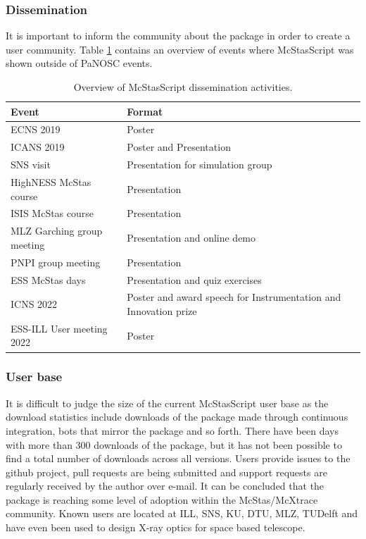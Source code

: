\documentclass[11pt, a4paper]{article}
\begin{document}
\subsubsection{Dissemination}
It is important to inform the community about the package in order to create a user community. Table \ref{tab:Dissemination} contains an overview of events where McStasScript was shown outside of PaNOSC events.

\begin{table}[h!!!]
\centering
\begin{tabular}{l|l}
Event & Format \\\hline
ECNS 2019 & Poster \\
ICANS 2019 & Poster and Presentation \\
SNS visit & Presentation for simulation group \\
HighNESS McStas course & Presentation \\
ISIS McStas course & Presentation \\
MLZ Garching group meeting & Presentation and online demo \\
PNPI group meeting & Presentation \\
ESS McStas days & Presentation and quiz exercises \\
ICNS 2022 & Poster and award speech for Instrumentation and Innovation prize \\
ESS-ILL User meeting 2022 & Poster \\
\end{tabular}
\caption{\label{tab:Dissemination} Overview of McStasScript dissemination activities.}
\end{table}

\subsubsection{User base}
It is difficult to judge the size of the current McStasScript user base as the download statistics include downloads of the package made through continuous integration, bots that mirror the package and so forth. There have been days with more than 300 downloads of the package, but it has not been possible to find a total number of downloads across all versions. Users provide issues to the github project, pull requests are being submitted and support requests are regularly received by the author over e-mail. It can be concluded that the package is reaching some level of adoption within the McStas/McXtrace community. Known users are located at ILL, SNS, KU, DTU, MLZ, TUDelft and have even been used to design X-ray optics for space based telescope.
\end{document}
